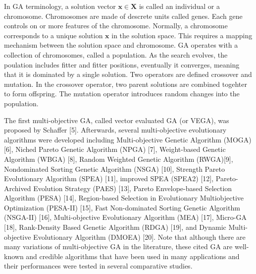 In GA terminology, a solution vector $\bm{x}\in\bm{X}$ is called an individual or a chromosome.  Chromosomes are made of descrete units called genes.  Each gene controls on or more features of the chromosome.  Normally, a chromosome corresponds to a unique solution $\bm{x}$ in the solution space.  This requires a mapping mechanism between the solution space and chromosome.  GA operates with a collection of chromosomes, called a population.  As the search evolves, the poulation includes fitter and fitter positions, eventually it converges, meaning that it is dominated by a single solution.  Two operators are defined crossover and mutation.  In the crossover operator, two parent solutions are combined togehter to form offspring.  The mutation operator introduces random changes into the population.

The first multi-objective GA, called vector evaluated GA (or VEGA), was proposed by Schaffer [5]. Afterwards, several multi-objective evolutionary algorithms were developed including Multi-objective Genetic Algorithm (MOGA) [6], Niched Pareto Genetic Algorithm (NPGA) [7], Weight-based Genetic Algorithm (WBGA) [8], Random Weighted Genetic Algorithm (RWGA)[9], Nondominated Sorting Genetic Algorithm (NSGA) [10], Strength Pareto Evolutionary Algorithm (SPEA) [11], improved SPEA (SPEA2) [12], Pareto-Archived Evolution Strategy (PAES) [13], Pareto Envelope-based Selection Algorithm (PESA) [14], Region-based Selection in Evolutionary Multiobjective Optimization (PESA-II) [15], Fast Non-dominated Sorting Genetic Algorithm (NSGA-II) [16], Multi-objective Evolutionary Algorithm (MEA) [17], Micro-GA [18], Rank-Density Based Genetic Algorithm (RDGA) [19], and Dynamic Multi-objective Evolutionary Algorithm (DMOEA) [20]. Note that although there are many variations of multi-objective GA in the literature, these cited GA are well-known and credible algorithms that have been used in many applications and their performances were tested in several comparative studies.

